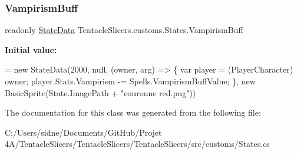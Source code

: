\subsubsection{\texorpdfstring{Vampirism\+Buff}{VampirismBuff}}
{\footnotesize\ttfamily readonly \hyperlink{class_tentacle_slicers_1_1states_1_1_state_data}{State\+Data} Tentacle\+Slicers.\+customs.\+States.\+Vampirism\+Buff\hspace{0.3cm}{\ttfamily [static]}}

{\bfseries Initial value\+:}
\begin{DoxyCode}
= \textcolor{keyword}{new} StateData(2000, null, (owner, arg) =>
        \{
            var player = (PlayerCharacter) owner;
            player.Stats.Vampirism -= Spells.VampirismBuffValue;
        \}, \textcolor{keyword}{new} BasicSprite(State.ImagePath + \textcolor{stringliteral}{"couronne red.png"}))
\end{DoxyCode}


The documentation for this class was generated from the following file\+:\begin{DoxyCompactItemize}
\item 
C\+:/\+Users/sidne/\+Documents/\+Git\+Hub/\+Projet 4\+A/\+Tentacle\+Slicers/\+Tentacle\+Slicers/\+Tentacle\+Slicers/src/customs/States.\+cs\end{DoxyCompactItemize}
